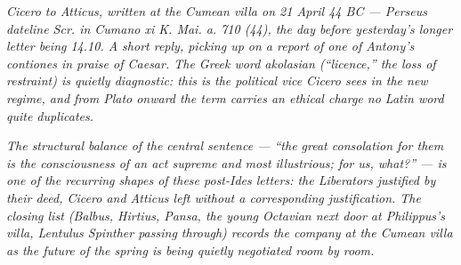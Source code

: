 
\textit{Cicero to Atticus, written at the Cumean villa on 21
April 44 BC --- Perseus dateline \textit{Scr. in Cumano xi K.
Mai. a. 710 (44)}, the day before yesterday's longer letter
being 14.10. A short reply, picking up on a report of one of
Antony's contiones in praise of Caesar. The Greek word
\textit{akolasian} (``licence,'' the loss of restraint) is
quietly diagnostic: this is the political vice Cicero sees in
the new regime, and from Plato onward the term carries an
ethical charge no Latin word quite duplicates.}

\textit{The structural balance of the central sentence ---
``the great consolation for them is the consciousness of an
act supreme and most illustrious; for us, what?'' --- is one of
the recurring shapes of these post-Ides letters: the
Liberators justified by their deed, Cicero and Atticus left
without a corresponding justification. The closing list (Balbus,
Hirtius, Pansa, the young Octavian next door at Philippus's
villa, Lentulus Spinther passing through) records the company
at the Cumean villa as the future of the spring is being
quietly negotiated room by room.}
